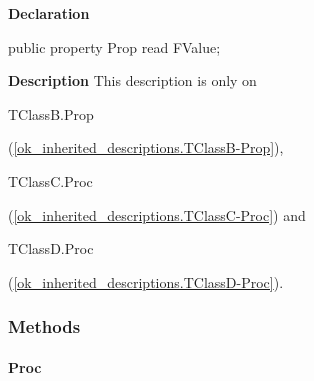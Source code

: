 \documentclass{report}
\begin{document}
\begin{list}{}{
\setlength{\itemindent}{0cm}
\setlength{\listparindent}{0cm}
\setlength{\leftmargin}{\evensidemargin}
\addtolength{\leftmargin}{\tmplength}
\settowidth{\labelsep}{X}
\addtolength{\leftmargin}{\labelsep}
\setlength{\labelwidth}{\tmplength}
}
\begin{flushleft}
\item[\textbf{Declaration}\hfill]
\begin{ttfamily}
public property Prop read FValue;\end{ttfamily}


\end{flushleft}
\par
\item[\textbf{Description}]
This description is only on \begin{ttfamily}TClassB.Prop\end{ttfamily}(\ref{ok_inherited_descriptions.TClassB-Prop}), \begin{ttfamily}TClassC.Proc\end{ttfamily}(\ref{ok_inherited_descriptions.TClassC-Proc}) and \begin{ttfamily}TClassD.Proc\end{ttfamily}(\ref{ok_inherited_descriptions.TClassD-Proc}).

\end{list}
\subsubsection*{\large{\textbf{Methods}}\normalsize\hspace{1ex}\hfill}
\paragraph*{Proc}\hspace*{\fill}
\end{document}
